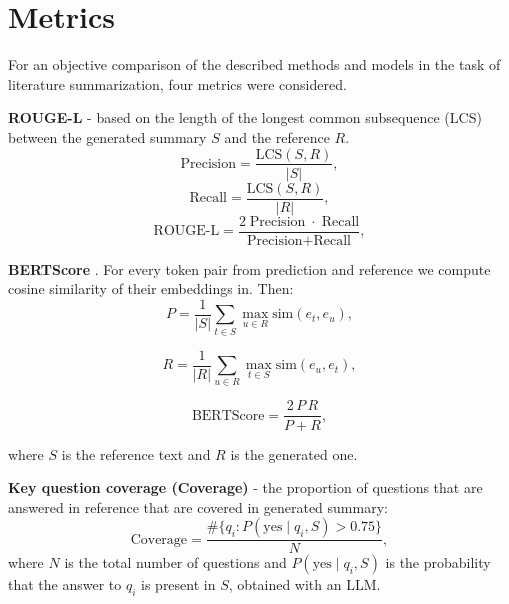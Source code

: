 \documentclass{superfri}
\begin{document}

\section{Metrics}

For an objective comparison of the described methods and models in the task of literature summarization, four metrics were considered.

\textbf{ROUGE-L} \cite{rouge} - based on the length of the longest common subsequence (LCS) between the generated summary $S$ and the reference $R$.
\begin{equation}
  \text{Precision} = \frac{\mathrm{LCS}(S,R)}{|S|},
\end{equation}
\begin{equation}
  \text{Recall} = \frac{\mathrm{LCS}(S,R)}{|R|},
\end{equation}
\begin{equation}
  \text{ROUGE-L} = \frac{2\;\text{Precision}\;\cdot\;\text{Recall}}{\text{Precision} + \text{Recall}},
\end{equation}

\textbf{BERTScore} \cite{bertscore}. For every token pair from prediction and reference we compute cosine similarity of their embeddings in. Then:
\begin{equation}
P = \frac{1}{|S|}\sum_{t\in S}\max_{u\in R}\!\mathrm{sim}(e_t, e_u),
\end{equation}

\begin{equation}
R = \frac{1}{|R|}\sum_{u\in R}\max_{t\in S}\!\mathrm{sim}(e_u, e_t),
\end{equation}

\begin{equation}
\text{BERTScore} = \frac{2\,P\,R}{P+R},
\end{equation}

where \(S\) is the reference text and \(R\) is the generated one.

\textbf{Key question coverage (Coverage)} - the proportion of questions that are answered in reference that are covered in generated summary:
\begin{equation}
  \text{Coverage} = \frac{\#\{q_i\colon P(\text{yes}\mid q_i,S)\!>\!0.75\}}{N},
\end{equation}
where $N$ is the total number of questions and $P(\text{yes}\mid q_i,S)$ is the probability that the answer to $q_i$ is present in $S$,
obtained with an LLM.
\end{document}
